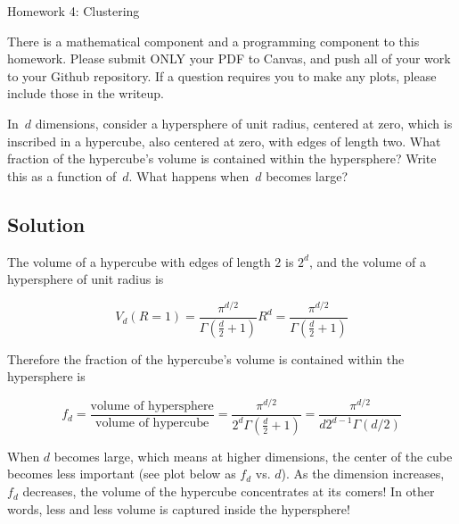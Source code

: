 \documentclass[submit]{harvardml}
\begin{document}
\begin{center}
{\Large Homework 4: Clustering}\\
\end{center}

There is a mathematical component and a programming component to this homework.
Please submit ONLY your PDF to Canvas, and push all of your work to your Github
repository. If a question requires you to make any plots, please
include those in the writeup.


\begin{problem}
In~$d$ dimensions, consider a hypersphere of unit radius, centered at zero,
which is inscribed in a hypercube, also centered at zero, with edges of length
two.  What fraction of the hypercube's volume is contained within the
hypersphere?  Write this as a function of~$d$.  What happens when~$d$ becomes
large?
\end{problem}
\subsection*{Solution}

The volume of a hypercube with edges of length $2$ is $2^d$, and the volume of a hypersphere of unit radius is

$$ V_d(R=1) = \frac{\pi^{d/2}}{\Gamma(\frac{d}{2}+1)}R^d = \frac{\pi^{d/2}}{\Gamma(\frac{d}{2}+1)} $$

Therefore the fraction of the hypercube's volume is contained within the hypersphere is 

$$ f_d = \frac{\text{volume of hypersphere}}{\text{volume of hypercube}} 
= \frac{\pi^{d/2}}{2^d\Gamma(\frac{d}{2}+1)}
= \frac{\pi^{d/2}}{d2^{d-1}\Gamma(d/2)} $$

When $d$ becomes large, which means at higher dimensions, the center of the cube becomes less important (see plot below as $f_d$ vs. $d$). As the dimension increases, $f_d$ decreases, the volume of the hypercube concentrates at its comers! In other words, less and less volume is captured inside the hypersphere!
\end{document}
